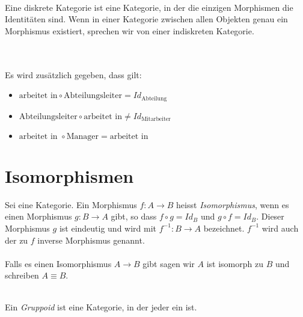 \documentclass{article}
\renewcommand{\id}{\ensuremath{Id}}
\begin{document}
	 	\begin{defi}
	 	 \cite[Beispiel 2.2.31]{Bra} \\
	 		Eine diskrete Kategorie ist eine Kategorie, in der die einzigen Morphismen die Identit\"aten sind.
	 		Wenn in einer Kategorie zwischen allen Objekten genau ein Morphismus existiert, sprechen wir von einer indiskreten Kategorie.
	 	\end{defi}	
	 		\newpage
	 \begin{bsp}[Datenbanken]
		  \cite[Beispiel 2.2.33]{Bra} \\
		  \\
		 Es wird zus\"atzlich gegeben, dass gilt:
		 \begin{itemize}
			 \item \( \text{arbeitet \ in} \circ \text{Abteilungsleiter}= \id_\text{Abteilung}  \)
			 \item \( \text{Abteilungsleiter} \circ \text{arbeitet \ in} \neq \id_\text{Mitarbeiter}  \)
			 \item \( \text{arbeitet \ in }  \circ \text{Manager} = \text{arbeitet \ in } \)
		 \end{itemize}
	 \end{bsp}
	
	\section{Isomorphismen}
		
		\begin{defi}[Isomorphismus]
		 \cite[Definition 2.3.1]{Bra}
		Sei \CatC eine Kategorie. Ein Morphismus \( f: A \to B  \) heisst  \emph{Isomorphismus}, wenn es einen Morphismus \( g: B \to A \) gibt, so dass \( f \circ g  = \id_B \) und \( g \circ f = \id_B \). 
		Dieser Morphismus \( g \) ist eindeutig und wird mit \( f^{-1} :B \to A \) bezeichnet.
		\(f^{-1} \) wird auch der zu \( f \)  inverse Morphismus genannt.\\

		 \\

		Falls es einen Isomorphismus \( A \to B \) gibt sagen wir \( A \) ist isomorph zu \( B \) und schreiben \( A \equiv B \).
		\end{defi}
		
		\begin{defi}[Gruppoid]
		  \cite[Beispiel 2.2.34]{Bra} \\
		 Ein \emph{Gruppoid} ist eine Kategorie, in der jeder \Mor ein \Iso ist.
		\end{defi}
		  
\end{document}
